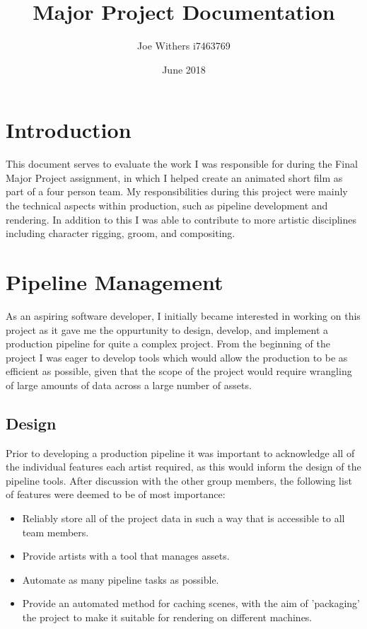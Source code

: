 \documentclass[11pt]{article}
\title{\textbf{Major Project Documentation}}
\author{Joe Withers i7463769}
\date{June 2018}
\begin{document}
\maketitle

\newpage

\tableofcontents

\newpage

\section{Introduction}

This document serves to evaluate the work I was responsible for during the Final Major Project assignment, in which I helped create an animated short film as part of a four person team. My responsibilities during this project were mainly the technical aspects within production, such as pipeline development and rendering. In addition to this I was able to contribute to more artistic disciplines including character rigging, groom, and compositing.

\section{Pipeline Management}

As an aspiring software developer, I initially became interested in working on this project as it gave me the oppurtunity to design, develop, and implement a production pipeline for quite a complex project. From the beginning of the project I was eager to develop tools which would allow the production to be as efficient as possible, given that the scope of the project would require wrangling of large amounts of data across a large number of assets.

\subsection{Design}

Prior to developing a production pipeline it was important to acknowledge all of the individual features each artist required, as this would inform the design of the pipeline tools. After discussion with the other group members, the following list of features were deemed to be of most importance:

\begin{itemize}

\item Reliably store all of the project data in such a way that is accessible to all team members.

\item Provide artists with a tool that manages assets.

\item Automate as many pipeline tasks as possible.

\item Provide an automated method for caching scenes, with the aim of 'packaging' the project to make it suitable for rendering on different machines.

\end{itemize}
\end{document}
